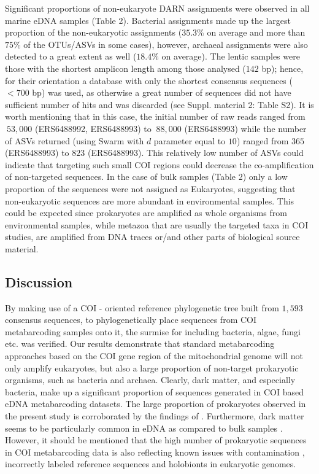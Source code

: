    Significant proportions of non-eukaryote DARN assignments were observed in all marine eDNA samples (Table 2). 
   Bacterial assignments made up the largest proportion of the non-eukaryotic assignments 
   ($35.3\%$ on average and more than $75\%$ of the OTUs/ASVs in some cases), however, archaeal assignments 
   were also detected to a great extent as well ($18.4\%$ on average). 
   The lentic samples were those with the shortest amplicon length among those analysed ($142$ bp); 
   hence, for their orientation a database with only the shortest consensus sequences ($<700$ bp) was used, as otherwise a great number of sequences did not have sufficient number of hits and was discarded (see Suppl. material 2: Table S2). 
   It is worth mentioning that in this case, the initial number of raw reads ranged 
   from $~53,000$ (ERS6488992, ERS6488993) to $~88,000$ (ERS6488993) while the number of ASVs returned 
   (using Swarm with $d$ parameter equal to $10$) ranged from $365$ (ERS6488993) to $823$ (ERS6488993). 
   This relatively low number of ASVs could indicate that targeting such small COI regions could decrease the 
   co-amplification of non-targeted sequences. 
   In the case of bulk samples (Table 2) only a low proportion of the sequences were not assigned as Eukaryotes, suggesting that non-eukaryotic sequences are more abundant in environmental samples. 
   This could be expected since prokaryotes are amplified as whole organisms from environmental samples, while metazoa that are usually the targeted taxa in COI studies, are amplified from DNA traces or/and other parts of biological source material.



\subsection{Discussion}

   By making use of a COI - oriented reference phylogenetic tree built from $1,593$ consensus sequences, to phylogenetically place sequences from COI metabarcoding samples onto it, the surmise for including bacteria, algae, fungi etc. \citep{yang2013testing, aylagas2016benchmarking} was verified. 
   Our results demonstrate that standard metabarcoding approaches based on the COI gene region of the mitochondrial genome will not only amplify eukaryotes, but also a large proportion of non-target prokaryotic organisms, such as bacteria and archaea. 
   Clearly, dark matter, and especially bacteria, make up a significant proportion of sequences generated in COI based eDNA metabarcoding datasets. 
   The large proportion of prokaryotes observed in the present study is corroborated by the findings of \citep{yang2013testing}. 
   Furthermore, dark matter seems to be particularly common in eDNA as compared to bulk samples \citep{andujar2018coi}. 
   However, it should be mentioned that the high number of prokaryotic sequences in COI metabarcoding data is also reflecting known issues with contamination 
   \citep{kumar2013blobology, dittami2017detection, de2020contaminations}, 
   incorrectly labeled reference sequences \citep{steinegger2020terminating} and holobionts 
   \citep{gilbert2012symbiotic, salvucci2016microbiome} in eukaryotic genomes.

